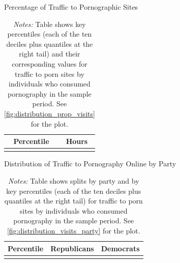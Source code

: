 \documentclass[12pt, letterpaper]{article}
\begin{document}
\begin{table} \centering \small \setlength\tabcolsep{10 pt}
	\caption{Percentage of Traffic to Pornographic Sites}
	\label{tab:distribution_prop_visits}
	\begin{adjustbox}{max width=\textwidth}
		\begin{tabular}{cr}
			\toprule
			\multicolumn{1}{c}{\textbf{Percentile}}&\multicolumn{1}{c}{\textbf{Hours}}\\
			\midrule
			\\
			\bottomrule
		\end{tabular}
	\end{adjustbox}
	\caption*{\footnotesize \emph{Notes:} 
		Table shows key percentiles (each of the ten deciles plus quantiles at the right tail) and their corresponding values for traffic to porn sites by individuals who consumed pornography in the sample period. 
		See \cref{fig:distribution_prop_visits} for the plot.
	}
\end{table}


\begin{table} \centering \small \setlength\tabcolsep{10 pt}
	\caption{Distribution of Traffic to Pornography Online by Party}
	\label{tab:distribution_visits_party}
	\begin{adjustbox}{max width=\textwidth}
		\begin{tabular}{crr}
			\toprule
			\multicolumn{1}{l}{\textbf{Percentile}}&\multicolumn{1}{c}{\textbf{Republicans}}&\multicolumn{1}{r}{\textbf{Democrats}}\\
			\midrule
			\\
			\bottomrule
		\end{tabular}
	\end{adjustbox}
	\caption*{\footnotesize \emph{Notes:} 
		Table shows splits by party and by key percentiles (each of the ten deciles plus quantiles at the right tail) for traffic to porn sites by individuals who consumed pornography in the sample period. See \cref{fig:distribution_visits_party} for the plot.
	}
\end{table}
\end{document}
